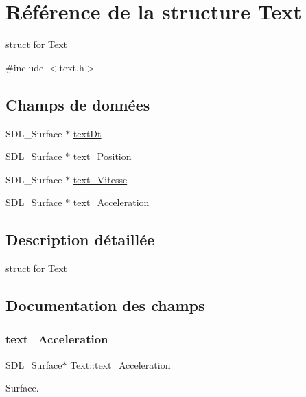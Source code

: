 \hypertarget{structText}{}\section{Référence de la structure Text}
\label{structText}


struct for \hyperlink{structText}{Text}  




{\ttfamily \#include $<$text.\+h$>$}

\subsection*{Champs de données}
\begin{DoxyCompactItemize}
\item 
S\+D\+L\+\_\+\+Surface $\ast$ \hyperlink{structText_aa9f1ddd6c46522be1712d469256e81ea}{text\+Dt}
\item 
S\+D\+L\+\_\+\+Surface $\ast$ \hyperlink{structText_aaaecac8acfd75d3d856eadb3f887beb7}{text\+\_\+\+Position}
\item 
S\+D\+L\+\_\+\+Surface $\ast$ \hyperlink{structText_ad63fdcfb9a101546a60594eed8cac3e1}{text\+\_\+\+Vitesse}
\item 
S\+D\+L\+\_\+\+Surface $\ast$ \hyperlink{structText_a9c3acebc81d4aa6cbed1a3f75e0c8ea3}{text\+\_\+\+Acceleration}
\end{DoxyCompactItemize}


\subsection{Description détaillée}
struct for \hyperlink{structText}{Text} 

\subsection{Documentation des champs}
\mbox{\label{structText_a9c3acebc81d4aa6cbed1a3f75e0c8ea3}} 
\subsubsection{\texorpdfstring{text\+\_\+\+Acceleration}{text\_Acceleration}}
{\footnotesize\ttfamily S\+D\+L\+\_\+\+Surface$\ast$ Text\+::text\+\_\+\+Acceleration}

Surface. \mbox{\label{structText_aaaecac8acfd75d3d856eadb3f887beb7}} 
